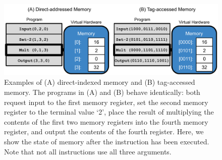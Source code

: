 \begin{figure}
  \includegraphics[width=1.0\columnwidth]{chapters/06-tag-access-memory/media/memory-access-overview.pdf}
  \caption{\small 
  Examples of (A) direct-indexed memory and (B) tag-accessed memory. 
  The programs in (A) and (B) behave identically: both request input to the first memory register, set the second memory register to the terminal value `2', place the result of multiplying the contents of the first two memory registers into the fourth memory register, and output the contents of the fourth register.
  Here, we show the state of memory after the  instruction has been executed. 
  Note that not all instructions use all three arguments.
  }
  \label{chapter:tag-accessed-memory:fig:memory-access-overview}
\end{figure}